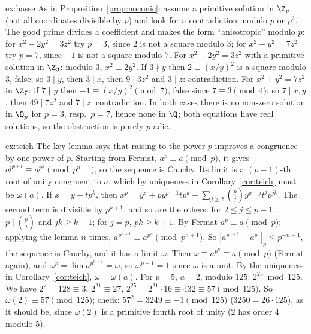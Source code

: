 \begin{solution}{ex:hasse}
\idea As in Proposition~\ref{prop:noconic}: assume a primitive solution in $\Z_p$ (not all coordinates divisible by $p$) and look for a contradiction modulo $p$ or $p^2$. The good prime divides a coefficient and makes the form ``anisotropic'' modulo $p$: for $x^2-2y^2=3z^2$ try $p=3$, since $2$ is not a square modulo $3$; for $x^2+y^2=7z^2$ try $p=7$, since $-1$ is not a square modulo $7$.
\writeup For $x^2-2y^2=3z^2$ with a primitive solution in $\Z_3$: modulo $3$, $x^2\equiv2y^2$. If $3\nmid y$ then $2\equiv(x/y)^2$ is a square modulo $3$, false; so $3\mid y$, then $3\mid x$, then $9\mid3z^2$ and $3\mid z$: contradiction. For $x^2+y^2=7z^2$ in $\Z_7$: if $7\nmid y$ then $-1\equiv(x/y)^2\pmod7$, false since $7\equiv3\pmod4$; so $7\mid x,y$, then $49\mid7z^2$ and $7\mid z$: contradiction. In both cases there is no non-zero solution in $\Q_p$ for $p=3$, resp.\ $p=7$, hence none in $\Q$; both equations have real solutions, so the obstruction is purely $p$-adic.
\end{solution}

\begin{solution}{ex:teich}
\idea The key lemma says that raising to the power $p$ improves a congruence by one power of $p$. Starting from Fermat, $a^p\equiv a\pmod p$, it gives $a^{p^{n+1}}\equiv a^{p^n}\pmod{p^{n+1}}$, so the sequence is Cauchy. Its limit is a $(p-1)$-th root of unity congruent to $a$, which by uniqueness in Corollary~\ref{cor:teich} must be $\omega(a)$.
\writeup If $x=y+tp^k$, then $x^p=y^p+py^{p-1}tp^k+\sum_{j\ge2}\binom pjy^{p-j}t^jp^{jk}$. The second term is divisible by $p^{k+1}$, and so are the others: for $2\le j\le p-1$, $p\mid\binom pj$ and $jk\ge k+1$; for $j=p$, $pk\ge k+1$. By Fermat $a^p\equiv a\pmod p$; applying the lemma $n$ times, $a^{p^{n+1}}\equiv a^{p^n}\pmod{p^{n+1}}$. So $|a^{p^{n+1}}-a^{p^n}|_p\le p^{-n-1}$, the sequence is Cauchy, and it has a limit $\omega$. Then $\omega\equiv a^{p^n}\equiv a\pmod p$ (Fermat again), and $\omega^p=\lim a^{p^{n+1}}=\omega$, so $\omega^{p-1}=1$ since $\omega$ is a unit. By the uniqueness in Corollary~\ref{cor:teich}, $\omega=\omega(a)$. For $p=5$, $a=2$, modulo $125$: $2^{25}\bmod125$. We have $2^7=128\equiv3$, $2^{21}\equiv27$, $2^{25}=2^{21}\cdot16\equiv432\equiv57\pmod{125}$. So $\omega(2)\equiv57\pmod{125}$; check: $57^2=3249\equiv-1\pmod{125}$ ($3250=26\cdot125$), as it should be, since $\omega(2)$ is a primitive fourth root of unity ($2$ has order $4$ modulo $5$).
\end{solution}

